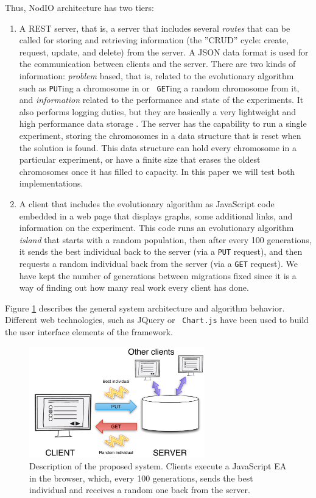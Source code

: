 \documentclass[letterpaper]{article}
\begin{document}
Thus, {\sf NodIO} architecture has two tiers:\begin{enumerate}
\item A REST server, that is, a server that includes several {\em
  routes} 
  that can be called for storing and retrieving information (the ''CRUD'' cycle:
  create, request, update, and delete) from the server. 
  A JSON data format is used for the communication between 
  clients and the server. There are two kinds of information:
  {\em problem} based, that is, related to the
  evolutionary algorithm such as {\tt PUT}ing a chromosome in or {\tt
  GET}ing a random chromosome from it, and {\em information} related
  to the performance and state of the experiments. It also performs logging
  duties, but they are basically a very lightweight and high performance
  data storage \citep{jj:idc:lowcost}.
  The server has the capability to
  run a single experiment, storing the chromosomes in a data structure
  that is reset when the solution is found. This data structure can
  hold every chromosome in a particular experiment, or have a finite
  size that erases the oldest chromosomes once it has filled to
  capacity. In this paper we will test both implementations.  
\item A client that includes the evolutionary algorithm as
  JavaScript code embedded in a web page that displays graphs, some
  additional links, and information on the experiment. This code runs
  an evolutionary algorithm {\em island} that starts with a random
  population, then after every 100 generations, it sends the best individual
  back to the server (via a {\tt PUT} request), and then requests a random
  individual back from the server (via a {\tt GET} request). We have
  kept the number of generations between migrations fixed since it is
  a way of finding out how many real work every client has done. 
\end{enumerate}

Figure \ref{fig:system} describes the general system architecture and
algorithm behavior. Different web technologies, such as JQuery or {\tt
  Chart.js} have
been used to build the user interface elements of the framework.


\begin{figure}[!t]
\centering
\includegraphics[width=3in]{system.pdf}
\caption{Description of the proposed system. Clients execute a JavaScript EA
  in the browser, which, every 100 generations, sends the best
  individual and receives a random one back from the server.}
\label{fig:system}
\end{figure}
\end{document}
